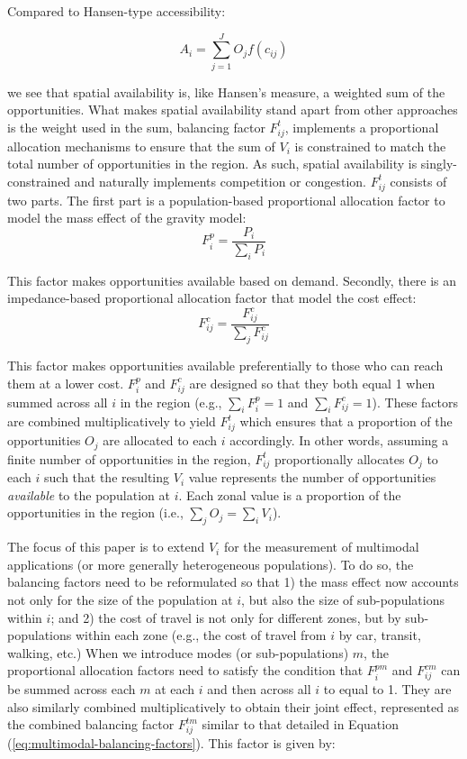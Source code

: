 \documentclass[10pt,letterpaper]{article}
\begin{document}
Compared to Hansen-type accessibility:

\begin{equation}
\label{eq:hansen-accessibility}
A_i = \sum_{j=1}^J O_jf(c_{ij})
\end{equation}

\noindent we see that spatial availability is, like Hansen's measure, a
weighted sum of the opportunities. What makes spatial availability stand
apart from other approaches is the weight used in the sum, balancing
factor \(F^t_{ij}\), implements a proportional allocation mechanisms to
ensure that the sum of \(V_i\) is constrained to match the total number
of opportunities in the region. As such, spatial availability is
singly-constrained and naturally implements competition or congestion.
\(F^t_{ij}\) consists of two parts. The first part is a population-based
proportional allocation factor to model the mass effect of the gravity
model: \[
F^p_{i} = \frac{P_i}{\sum_i P_i}
\]

This factor makes opportunities available based on demand. Secondly,
there is an impedance-based proportional allocation factor that model
the cost effect: \[
F^c_{ij} = \frac{F^c_{ij}}{\sum_j F^c_{ij}}
\]

This factor makes opportunities available preferentially to those who
can reach them at a lower cost. \(F^p_{i}\) and \(F^c_{ij}\) are
designed so that they both equal 1 when summed across all \(i\) in the
region (e.g., \(\sum_i F^p_{i} = 1\) and \(\sum_i F^c_{ij} = 1\)). These
factors are combined multiplicatively to yield \(F^t_{ij}\) which
ensures that a proportion of the opportunities \(O_j\) are allocated to
each \(i\) accordingly. In other words, assuming a finite number of
opportunities in the region, \(F^t_{ij}\) proportionally allocates
\(O_j\) to each \(i\) such that the resulting \(V_i\) value represents
the number of opportunities \emph{available} to the population at \(i\).
Each zonal value is a proportion of the opportunities in the region
(i.e., \(\sum_j O_j = \sum_i V_i\)).

The focus of this paper is to extend \(V_i\) for the measurement of
multimodal applications (or more generally heterogeneous populations).
To do so, the balancing factors need to be reformulated so that 1) the
mass effect now accounts not only for the size of the population at
\(i\), but also the size of sub-populations within \(i\); and 2) the
cost of travel is not only for different zones, but by sub-populations
within each zone (e.g., the cost of travel from \(i\) by car, transit,
walking, etc.) When we introduce modes (or sub-populations) \(m\), the
proportional allocation factors need to satisfy the condition that
\(F^{pm}_{i}\) and \(F^{cm}_{ij}\) can be summed across each \(m\) at
each \(i\) and then across all \(i\) to equal to 1. They are also
similarly combined multiplicatively to obtain their joint effect,
represented as the combined balancing factor \(F^{tm}_{ij}\) similar to
that detailed in Equation (\ref{eq:multimodal-balancing-factors}). This
factor is given by:
\end{document}
